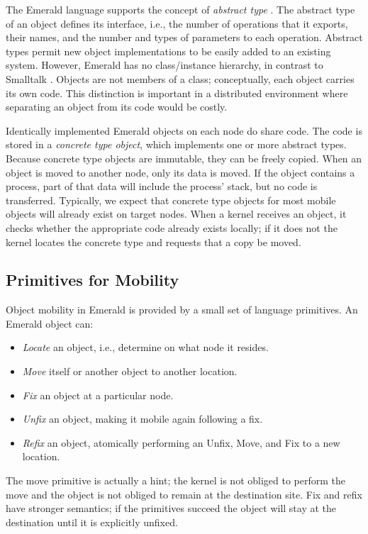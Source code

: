 The Emerald language supports the concept of
{\em abstract type} \cite{em1}.  The abstract type of
an object defines its interface, i.e., the number 
of operations that it exports,
their names, and the number and types of
parameters to each operation.   Abstract types permit new object
implementations to be easily added to an existing system.
However, Emerald has no class/instance
hierarchy, in contrast to Smalltalk \cite{smalltalk}. 
Objects are not members of a class; conceptually,
each object carries its own code.  This distinction
is important in a distributed environment where separating an object
from its code would be costly.

Identically implemented Emerald objects on each node do share code.
The code is
stored in a {\em concrete type object}, which implements
one or more abstract types.  Because concrete type
objects are immutable, they can be freely copied.  When an
object is moved to another node, only its data is moved.  If the object
contains a process, part of that data will include the process' stack, but no
code is transferred.  Typically,
we expect that concrete type objects for most mobile objects will already
exist on target nodes.  When a kernel receives an object, it checks 
whether the appropriate
code already exists locally;  if it does not the kernel locates
the concrete type and requests that a copy be moved.


\subsection{Primitives for Mobility}

Object mobility in Emerald is provided by a small set of language
primitives.   An Emerald object can:
\begin{itemize}
\item {\em Locate} an object, i.e., determine on what node it
resides.

\item {\em Move} itself or another object to another location.

\item {\em Fix} an object at a particular node.

\item {\em Unfix} an object, making it mobile again following a fix.

\item {\em Refix} an object, atomically performing an Unfix, Move,
and Fix to a new location.
\end{itemize}
The move primitive is actually a hint;  the kernel is not obliged
to perform the move and the object is not obliged to remain at the
destination site.  Fix and refix have stronger semantics;  if the primitives
succeed the
object will stay at the destination until it is explicitly unfixed.

